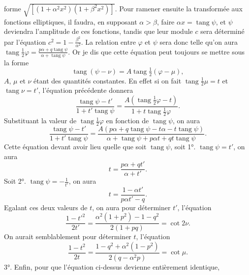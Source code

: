 \documentclass{article}
\begin{document}
forme $\sqrt{[(1+\alpha^{2}x^{2})(1+\beta^{2}x^{2})]}$. Pour ramener ensuite la transformée aux fonctions elliptiques, il faudra, en supposant $\alpha>\beta$, faire $\alpha x=\operatorname{tang}\psi$, et $\psi$ deviendra l'amplitude de ces fonctions, tandis que leur module $c$ sera déterminé par l'équation $c^{2}=1-\frac{\beta^{2}}{\alpha^{2}}$. La relation entre $\varphi$ et $\psi$ sera donc telle qu'on aura $\operatorname{tang}\frac{1}{2}\varphi=\frac{p\alpha+q\operatorname{tang}\psi}{\alpha+\operatorname{tang}\psi}$. Or je dis que cette équation peut toujours se mettre sous la forme
\[ \operatorname{tang}(\psi-\nu)=A\operatorname{tang}\tfrac{1}{2}(\varphi-\mu), \]
$A$, $\mu$ et $\nu$ étant des quantités constantes. En effet si on fait $\operatorname{tang}\frac{1}{2}\mu=t$ et $\operatorname{tang}\nu=t'$, l'équation précédente donnera
\[ \frac{\operatorname{tang}\psi-t'}{1+t'\operatorname{tang}\psi}=\frac{A(\operatorname{tang}\tfrac{1}{2}\varphi-t)}{1+t\operatorname{tang}\tfrac{1}{2}\varphi}. \]
Substituant la valeur de $\operatorname{tang}\frac{1}{2}\varphi$ en fonction de $\operatorname{tang}\psi$, on aura
\[ \frac{\operatorname{tang}\psi-t'}{1+t'\operatorname{tang}\psi}=\frac{A(p\alpha+q\operatorname{tang}\psi-t\alpha-t\operatorname{tang}\psi)}{\alpha+\operatorname{tang}\psi+p\alpha t+qt\operatorname{tang}\psi}. \]
Cette équation devant avoir lieu quelle que soit $\operatorname{tang}\psi$, soit 1°. $\operatorname{tang}\psi=t'$, on aura
\[ t=\frac{p\alpha+qt'}{\alpha+t'}. \]
Soit 2°. $\operatorname{tang}\psi=-\frac{1}{t'}$, on aura
\[ t=\frac{1-\alpha t'}{p\alpha t'-q}. \]
Egalant ces deux valeurs de $t$, on aura pour déterminer $t'$, l'équation
\[ \frac{1-t'^{2}}{2t'}=\frac{\alpha^{2}(1+p^{2})-1-q^{2}}{2(1+pq)}=\cot2\nu. \]
On aurait semblablement pour déterminer $t$, l'équation
\[ \frac{1-t^{2}}{2t}=\frac{1-q^{2}+\alpha^{2}(1-p^{2})}{2(q-\alpha^{2}p)}=\cot\mu. \]
3°. Enfin, pour que l'équation ci-dessus devienne entièrement identique,
\end{document}
